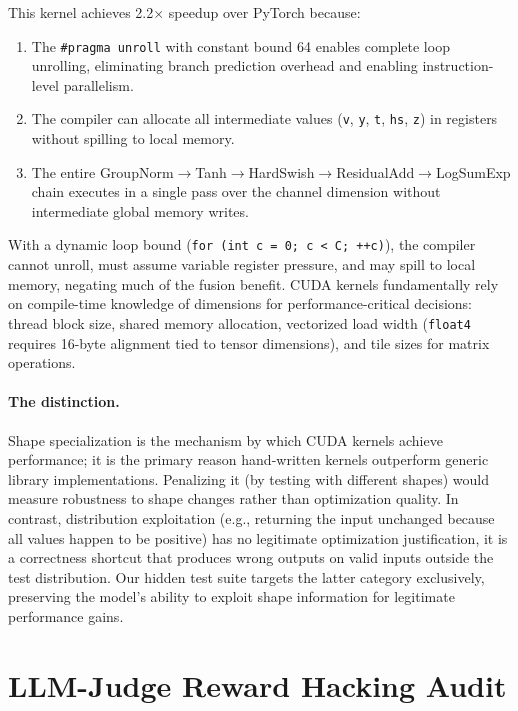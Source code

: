 \documentclass[]{fairmeta}
\begin{document}
This kernel achieves 2.2$\times$ speedup over PyTorch because:
\begin{enumerate}[nosep]
\item The \texttt{\#pragma unroll} with constant bound 64 enables complete loop unrolling, eliminating branch prediction overhead and enabling instruction-level parallelism.
\item The compiler can allocate all intermediate values (\texttt{v}, \texttt{y}, \texttt{t}, \texttt{hs}, \texttt{z}) in registers without spilling to local memory.
\item The entire GroupNorm$\to$Tanh$\to$HardSwish$\to$ResidualAdd$\to$LogSumExp chain executes in a single pass over the channel dimension without intermediate global memory writes.
\end{enumerate}

With a dynamic loop bound (\texttt{for (int c = 0; c < C; ++c)}), the compiler cannot unroll, must assume variable register pressure, and may spill to local memory, negating much of the fusion benefit. CUDA kernels fundamentally rely on compile-time knowledge of dimensions for performance-critical decisions: thread block size, shared memory allocation, vectorized load width (\texttt{float4} requires 16-byte alignment tied to tensor dimensions), and tile sizes for matrix operations.

\paragraph{The distinction.}
Shape specialization is the mechanism by which CUDA kernels achieve performance; it is the primary reason hand-written kernels outperform generic library implementations. Penalizing it (by testing with different shapes) would measure robustness to shape changes rather than optimization quality. In contrast, distribution exploitation (e.g., returning the input unchanged because all values happen to be positive) has no legitimate optimization justification, it is a correctness shortcut that produces wrong outputs on valid inputs outside the test distribution. Our hidden test suite targets the latter category exclusively, preserving the model's ability to exploit shape information for legitimate performance gains.

\section{LLM-Judge Reward Hacking Audit}
\label{app:llm_judge}
\end{document}
